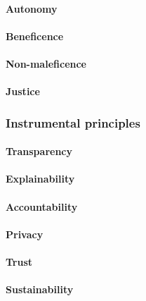 \paragraph{Autonomy}

\paragraph{Beneficence}

\paragraph{Non-maleficence}

\paragraph{Justice}


\subsubsection{Instrumental principles}

\paragraph{Transparency}

\paragraph{Explainability}

\paragraph{Accountability}

\paragraph{Privacy}

\paragraph{Trust}

\paragraph{Sustainability}

